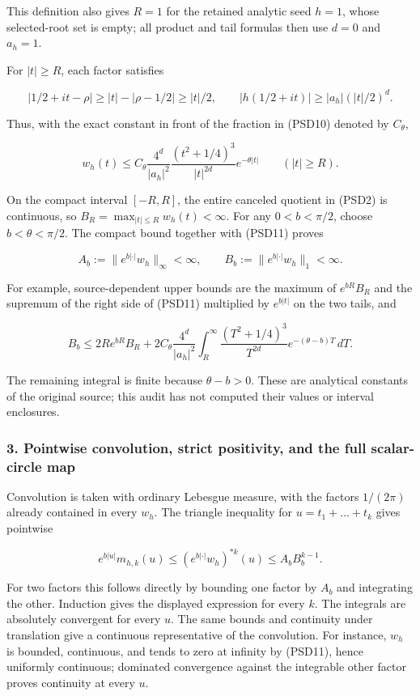 This definition also gives \(R=1\) for the retained analytic seed \(h=1\), whose selected-root set is empty; all product and tail formulas then use \(d=0\) and \(a_h=1\).

For \(|t|\ge R\), each factor satisfies

\[
|1/2+it-\rho|\ge |t|-|\rho-1/2|\ge |t|/2,
\qquad |h(1/2+it)|\ge |a_h|(|t|/2)^d.
\]

Thus, with the exact constant in front of the fraction in (PSD10) denoted by \(C_\theta\),

\[
w_h(t)\le
C_\theta\frac{4^d}{|a_h|^2}
\frac{(t^2+1/4)^3}{|t|^{2d}}e^{-\theta|t|}
\qquad(|t|\ge R).
\tag{PSD11}
\]

On the compact interval \([-R,R]\), the entire canceled quotient in (PSD2) is continuous, so \(B_R=\max_{|t|\le R}w_h(t)<\infty\). For any \(0<b<\pi/2\), choose \(b<\theta<\pi/2\). The compact bound together with (PSD11) proves

\[
A_b:=\|e^{b|\cdot|}w_h\|_\infty<\infty,
\qquad B_b:=\|e^{b|\cdot|}w_h\|_1<\infty.
\tag{PSD12}
\]

For example, source-dependent upper bounds are the maximum of \(e^{bR}B_R\) and the supremum of the right side of (PSD11) multiplied by \(e^{b|t|}\) on the two tails, and

\[
B_b\le 2Re^{bR}B_R+
2C_\theta\frac{4^d}{|a_h|^2}
\int_R^\infty\frac{(T^2+1/4)^3}{T^{2d}}
e^{-(\theta-b)T}\,dT.
\tag{PSD13}
\]

The remaining integral is finite because \(\theta-b>0\). These are analytical constants of the original source; this audit has not computed their values or interval enclosures.

\subsubsection{3. Pointwise convolution, strict positivity, and the full scalar-circle map}\label{pointwise-convolution-strict-positivity-and-the-full-scalar-circle-map}

Convolution is taken with ordinary Lebesgue measure, with the factors \(1/(2\pi)\) already contained in every \(w_h\). The triangle inequality for \(u=t_1+\ldots+t_k\) gives pointwise

\[
e^{b|u|}m_{h,k}(u)
\le(e^{b|\cdot|}w_h)^{*k}(u)
\le A_bB_b^{k-1}.
\tag{PSD14}
\]

For two factors this follows directly by bounding one factor by \(A_b\) and integrating the other. Induction gives the displayed expression for every \(k\). The integrals are absolutely convergent for every \(u\). The same bounds and continuity under translation give a continuous representative of the convolution. For instance, \(w_h\) is bounded, continuous, and tends to zero at infinity by (PSD11), hence uniformly continuous; dominated convergence against the integrable other factor proves continuity at every \(u\).

